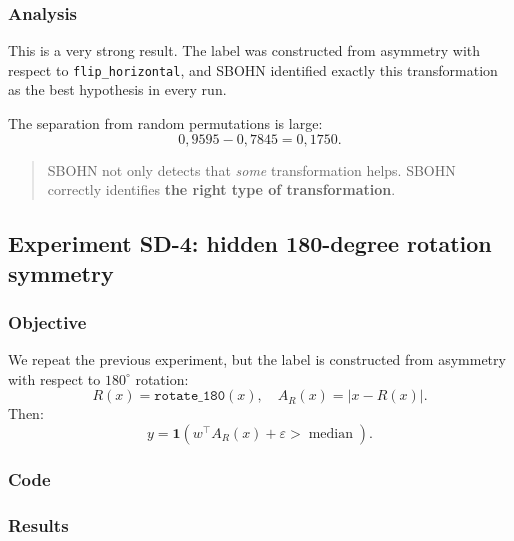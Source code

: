 \documentclass[11pt,a4paper]{report}
\begin{document}
\subsubsection{Analysis}

This is a very strong result. The label was constructed from asymmetry with respect to \texttt{flip\_horizontal}, and SBOHN identified exactly this transformation as the best hypothesis in every run.

The separation from random permutations is large:
\[
0{,}9595-0{,}7845=0{,}1750.
\]

\begin{quote}
SBOHN not only detects that \emph{some} transformation helps. SBOHN correctly identifies \textbf{the right type of transformation}.
\end{quote}

\subsection{Experiment SD-4: hidden 180-degree rotation symmetry}

\subsubsection{Objective}

We repeat the previous experiment, but the label is constructed from asymmetry with respect to $180^\circ$ rotation:
\[
R(x)=\texttt{rotate\_180}(x), \quad
A_R(x)=|x-R(x)|.
\]
Then:
\[
y=
\mathbf 1
\left(
w^\top A_R(x)+\varepsilon>
\operatorname{median}
\right).
\]

\subsubsection{Code}

\noindent{}


\subsubsection{Results}
\end{document}
